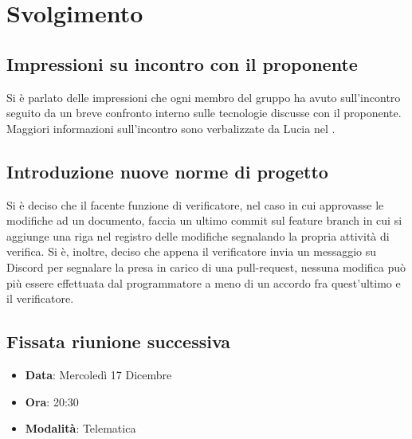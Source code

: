 \documentclass[]{article}
\begin{document}
	\newpage

	\section{Svolgimento}
		\subsection{Impressioni su incontro con il proponente}
		Si è parlato delle impressioni che ogni membro del gruppo ha avuto sull'incontro seguito da un breve confronto interno sulle tecnologie discusse con il proponente. Maggiori informazioni sull'incontro sono verbalizzate da Lucia nel .

		\subsection{Introduzione nuove norme di progetto}
		Si è deciso che il facente funzione di verificatore, nel caso in cui approvasse le modifiche ad un documento, faccia un ultimo commit sul feature branch in cui si aggiunge una riga nel registro delle modifiche segnalando la propria attività di verifica.
		Si è, inoltre, deciso che appena il verificatore invia un messaggio su Discord per segnalare la presa in carico di una pull-request, nessuna modifica può più essere effettuata dal programmatore a meno di un accordo fra quest'ultimo e il verificatore.

		\subsection{Fissata riunione successiva}
		\begin{itemize}
			\item \textbf{Data}: Mercoledì 17 Dicembre
			\item \textbf{Ora}: 20:30
			\item \textbf{Modalità}: Telematica
		\end{itemize}
\end{document}

